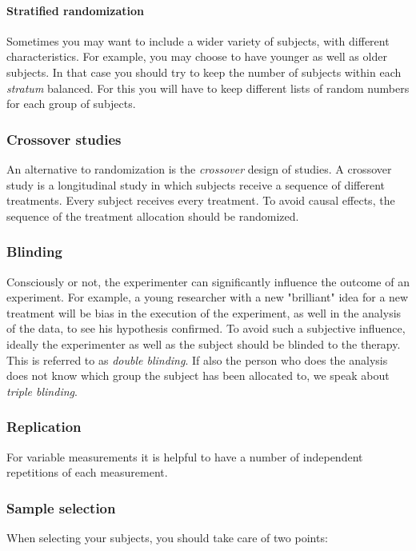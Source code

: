 \paragraph{Stratified randomization}
Sometimes you may want to include a wider variety of subjects, with different characteristics. For example, you may choose to have younger as well as older subjects. In that case you should try to keep the number of subjects within each \emph{stratum} balanced. For this you will have to keep different lists of random numbers for each group of subjects.

\subsubsection{Crossover studies} 
An alternative to randomization is the \emph{crossover} design of studies. A crossover study is a longitudinal study in which subjects receive a sequence of different treatments. Every subject receives every treatment. To avoid causal effects, the sequence of the treatment allocation should be randomized.

\subsubsection{Blinding} 
Consciously or not, the experimenter can significantly influence the outcome of an experiment. For example, a young researcher with a new "brilliant" idea for a new treatment will be bias in the execution of the experiment, as well in the analysis of the data, to see his hypothesis confirmed. To avoid such a subjective influence, ideally the experimenter as well as the subject should be blinded to the therapy. This is referred to as \emph{double blinding}. If also the person who does the analysis does not know which group the subject has been allocated to, we speak about \emph{triple blinding}.

\subsubsection{Replication} 
For variable measurements it is helpful to have a number of independent repetitions of each measurement.

\subsubsection{Sample selection} 
When selecting your subjects, you should take care of two points:


